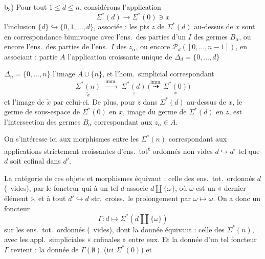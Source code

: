 \documentclass[11pt,a4paper]{article}
\begin{document}
\struck{\ill{}} b$_3$) Pour tout  $1\le d\le n$, considérons l'application
\[
\Sigma^{*}(d)\longrightarrow\Sigma^{*}(0)\ni x
\]
 \struck{\ill{}} l'inclusion \struck{\ill{}} $\lbrace d\rbrace\hookrightarrow\lbrace 0,1,\ldots,d\rbrace$, associée : les pts $z$ de $\Sigma^{*}(d)$ au-dessus de $x$ sont en correspondance biunivoque avec l'ens.\ des parties  d'un \struck{\ill{}} $I$ des germes $B_\alpha$, ou encore l'ens.\ des parties  de l'ens.\ $I$ des $z_\alpha$, ou encore  $\mathcal{P}_d([0,\ldots,n-1])$, en associant :  partie $A$ l'application  croissante unique de $\Delta_d=\lbrace 0,\ldots,d\rbrace$ 


$\Delta_n=\lbrace 0,\ldots,n\rbrace$   l'image  $A\cup\lbrace n\rbrace$, et l'hom.\ simplicial correspondant
\[
\underset{\tilde x}{\Sigma^{*}(n)}\ \xrightarrow{\ \text{imm.}\ }\ \underset{z}{\Sigma^{*}(d)}\ \Big(\overset{\text{imm.}}{\dashrightarrow}\ \underset{x}{\Sigma^{*}(0)}\Big)
\]
et l'image de $\tilde x$ par celui-ci. De plus, pour $z$ dans \struck{\ill{}} $\Sigma^{*}(d)$ au-dessus de $x$,  le germe de sous-espace de $\Sigma^{*}(0)$ en $x$, image du germe de $\Sigma^{*}(d)$ en $z$, est l'intersection des germes $B_\alpha$ correspondant aux $z_\alpha\in A$.

On s'intéresse ici aux morphismes entre les $\Sigma^{*}(n)$ correspondant aux applications strictement croissantes d'ens.\ tot\textsuperscript{t} ordonnés non vides $d\hookrightarrow d'$ tel que $d$ soit cofinal dans $d'$.

La catégorie de ces objets et morphismes équivaut : celle des ens.\ tot.\ ordonnés $d$ (\ vides), par le foncteur qui à un tel $d$ associe $d\amalg\lbrace\omega\rbrace$, où $\omega$ est un « dernier élément », et à tout $d'\hookrightarrow d$ str.\ croiss.\ le prolongement par $\omega\mapsto\omega$. On a donc \struck{\ill{}} un foncteur
\[
\Gamma : d\longmapsto\Sigma^{*}(d\amalg\lbrace\omega\rbrace)
\]
sur les ens.\ tot.\ ordonnés \struck{\ill{}} (\ vides), dont la donnée équivaut : celle des $\Sigma^{*}(n)$, avec les \struck{\ill{}} appl.\ simpliciales « cofinales » entre eux. Et la donnée d'un tel foncteur $\Gamma$ revient : la donnée de $\Gamma(\emptyset)$ (ici $\Sigma^{*}(0)$) et
\end{document}

